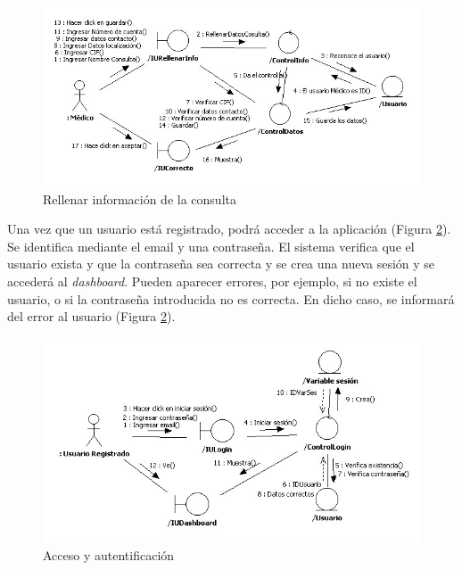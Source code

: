 		\begin{figure}[H]
		  \centering
		    \includegraphics[width=16cm]{img/jpg/colaboraciones/21_RellenarInfoConsulta.jpg}
		  \caption{Rellenar información de la consulta}
		  \label{fig:col_rellenarinfo_consulta}
		\end{figure}
		
		\newpage
		Una vez que un usuario está registrado, podrá acceder a la aplicación (Figura \ref{fig:col_acc_y_aut}). Se identifica mediante el email y una contraseña. El sistema verifica que el usuario exista y que la contraseña sea correcta y se crea una nueva sesión y se accederá al \textit{dashboard}. Pueden aparecer errores, por ejemplo, si no existe el usuario, o si la contraseña introducida no es correcta. En dicho caso, se informará del error al usuario (Figura \ref{fig:col_acc_y_aut}).
		
		\begin{figure}[H]
		  \centering
		    \includegraphics[width=16cm]{img/jpg/colaboraciones/23_Accesoyautentificacion.jpg}
		  \caption{Acceso y autentificación}
		  \label{fig:col_acc_y_aut}
		\end{figure}
		
